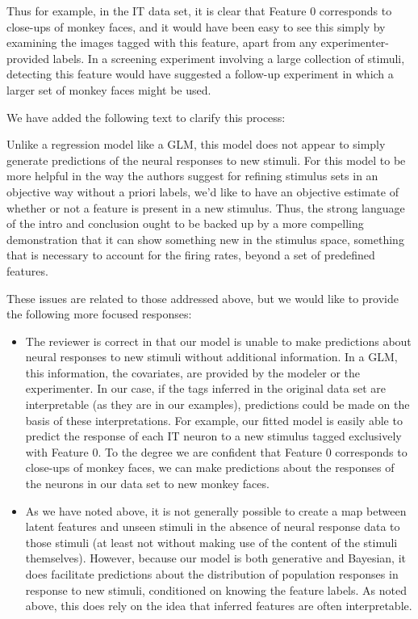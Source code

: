\documentclass[12pt,a4paper]{article}
\newcommand{\edit}[1]{\textcolor{edit}{#1}}
\begin{document}
\edit{
Thus for example, in the IT data set, it is clear that Feature 0 corresponds to close-ups of monkey faces, and it would have been easy to see this simply by examining the images tagged with this feature, apart from any experimenter-provided labels. In a screening experiment involving a large collection of stimuli, detecting this feature would have suggested a follow-up experiment in which a larger set of monkey faces might be used.
}

{\color{red} We have added the following text to clarify this process:}

Unlike a regression model like a GLM, this model does not appear to simply generate predictions of the neural responses to new stimuli. For this model to be more helpful in the way the authors suggest for refining stimulus sets in an objective way without a priori labels, we’d like to have an objective estimate of whether or not a feature is present in a new stimulus. Thus, the strong language of the intro and conclusion ought to be backed up by a more compelling demonstration that it can show something new in the stimulus space, something that is necessary to account for the firing rates, beyond a set of predefined features.

\edit{
These issues are related to those addressed above, but we would like to provide the following more focused responses:
\begin{itemize}
    \item The reviewer is correct in that our model is unable to make predictions about neural responses to new stimuli without additional information. In a GLM, this information, the covariates, are provided by the modeler or the experimenter. In our case, if the tags inferred in the original data set are interpretable (as they are in our examples), predictions could be made on the basis of these interpretations. For example, our fitted model is easily able to predict the response of each IT neuron to a new stimulus tagged exclusively with Feature 0. To the degree we are confident that Feature 0 corresponds to close-ups of monkey faces, we can make predictions about the responses of the neurons in our data set to new monkey faces.
    \item As we have noted above, it is not generally possible to create a map between latent features and unseen stimuli in the absence of neural response data to those stimuli (at least not without making use of the content of the stimuli themselves). However, because our model is both generative and Bayesian, it does facilitate predictions about the distribution of population responses in response to new stimuli, conditioned on knowing the feature labels. As noted above, this does rely on the idea that inferred features are often interpretable.
\end{itemize}
}
\end{document}
